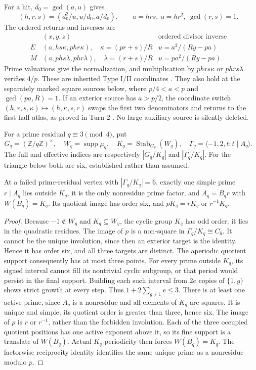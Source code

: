 For a hit, $d_0=\gcd(a,u)$ gives
\[
 (h,r,s)=(d_0^2/u,u/d_0,a/d_0),\qquad a=hrs,\ u=hr^2,\ \gcd(r,s)=1.
\]
The ordered returns and inverses are
\[
\begin{array}{c|c|c}
 & (x,y,z)&\text{ordered divisor inverse}\\\hline
 E& (a,hs\kappa,phr\kappa),\quad\kappa=(pr+s)/R
      &u=a^2/(Ry-pa)\\
 M& (a,phs\lambda,phr\lambda),\quad\lambda=(r+s)/R
      &u=pa^2/(Ry-pa).
\end{array}                                                   \tag{4}
\]
Prime valuations give the normalization, and multiplication by $phrs\kappa$ or
$phrs\lambda$ verifies $4/p$. These are inherited Type I/II coordinates
\cite[\S2, Propositions 2.2 and 2.6]{ET}. They also hold at the separately marked
square sources below, where $p/4<a<p$ and $\gcd(pa,R)=1$. If an exterior source
has $a>p/2$, the coordinate switch $(h,r,s,\kappa)\mapsto(h,\kappa,s,r)$ swaps
the first two denominators and returns to the first-half atlas, as proved in
Turn 2 \cite[\S2]{Turn2}. No large auxiliary source is silently deleted.

For a prime residual $q\equiv3\pmod4$, put
\[
 G_q=(\mathbb Z/q\mathbb Z)^\times,\quad
 W_q=\operatorname{supp}\mu_q,\quad
 K_q=\operatorname{Stab}_{G_q}(W_q),\quad
 \Gamma_q=\langle-1,2,t:t\mid A_q\rangle.                 \tag{5}
\]
The full and effective indices are respectively $|G_q/K_q|$ and $|\Gamma_q/K_q|$.
For the triangle below both are six, established rather than assumed.

\begin{lemma}\label{lem:primitive}
At a failed prime-residual vertex with $|\Gamma_q/K_q|=6$, exactly one simple
prime $r\mid A_q$ lies outside $K_q$, it is the only nonresidue prime factor,
and $A_q=B_qr$ with $W(B_q)=K_q$. Its quotient image has order six, and
$pK_q=rK_q$ or $r^{-1}K_q$.
\end{lemma}
\begin{proof}
Because $-1\notin W_q$ and $K_q\subseteq W_q$, the cyclic group $K_q$ has odd
order; it lies in the quadratic residues. The image of $p$ is a non-square in
$\Gamma_q/K_q\cong C_6$. It cannot be the unique involution, since then an
exterior target is the identity. Hence it has order six, and all three targets
are distinct. The aperiodic quotient support consequently has at most three
points. For every prime outside $K_q$, its signed interval cannot fill its
nontrivial cyclic subgroup, or that period would persist in the final support.
Building each such interval from $2e$ copies of $\{1,g\}$ shows strict growth
at every step. Thus $1+2\sum_{g\ne1}e\le3$. There is at least one active prime,
since $A_q$ is a nonresidue and all elements of $K_q$ are squares. It is unique
and simple; its quotient order is greater than three, hence six. The image of
$p$ is $r$ or $r^{-1}$, rather than the forbidden involution. Each of the three
occupied quotient positions has one active exponent above it, so its fine
support is a translate of $W(B_q)$. Actual $K_q$-periodicity then forces
$W(B_q)=K_q$. The factorwise reciprocity identity identifies the same unique
prime as a nonresidue modulo $p$.
\end{proof}

